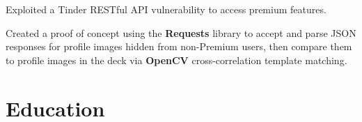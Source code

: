 \documentclass[]{jidicula-resume}
\begin{document}
\begin{tightemize}
\item Exploited a Tinder RESTful API vulnerability to access premium features.
\item Created a proof of concept using the \textbf{Requests} library to accept and parse JSON responses for profile images hidden from non-Premium users, then compare them to profile images in the deck via \textbf{OpenCV} cross-correlation template matching.
\end{tightemize}
\sectionsep{}


\section{Education}
\sectionsep{}

\end{document}
